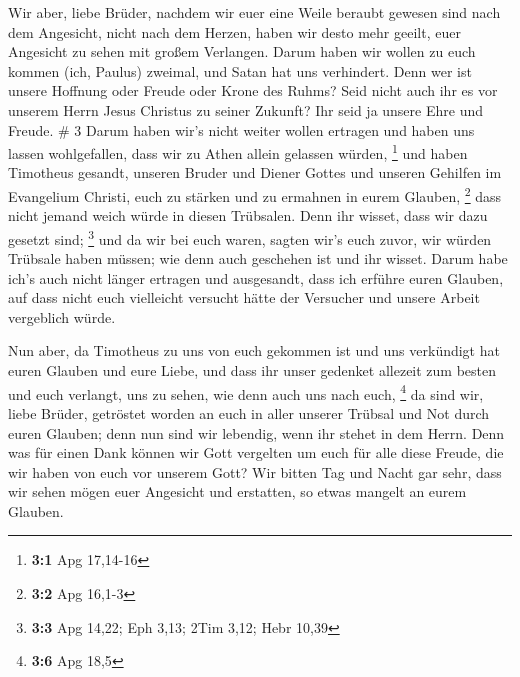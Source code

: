  Wir aber, liebe Brüder, nachdem wir euer eine Weile
beraubt gewesen sind nach dem Angesicht, nicht nach dem Herzen, haben
wir desto mehr geeilt, euer Angesicht zu sehen mit großem Verlangen.
 Darum haben wir wollen zu euch kommen (ich, Paulus)
zweimal, und Satan hat uns verhindert.  Denn wer ist unsere
Hoffnung oder Freude oder Krone des Ruhms? Seid nicht auch ihr es vor
unserem Herrn Jesus Christus zu seiner Zukunft?  Ihr seid
ja unsere Ehre und Freude. \# 3  Darum haben wir's nicht
weiter wollen ertragen und haben uns lassen wohlgefallen, dass wir zu
Athen allein gelassen würden, \footnote{\textbf{3:1} Apg 17,14-16}
 und haben Timotheus gesandt, unseren Bruder und Diener
Gottes und unseren Gehilfen im Evangelium Christi, euch zu stärken und
zu ermahnen in eurem Glauben, \footnote{\textbf{3:2} Apg 16,1-3}
 dass nicht jemand weich würde in diesen Trübsalen. Denn ihr
wisset, dass wir dazu gesetzt sind; \footnote{\textbf{3:3} Apg 14,22;
  Eph 3,13; 2Tim 3,12; Hebr 10,39}  und da wir bei euch
waren, sagten wir's euch zuvor, wir würden Trübsale haben müssen; wie
denn auch geschehen ist und ihr wisset.  Darum habe ich's
auch nicht länger ertragen und ausgesandt, dass ich erführe euren
Glauben, auf dass nicht euch vielleicht versucht hätte der Versucher und
unsere Arbeit vergeblich würde.

 Nun aber, da Timotheus zu uns von euch gekommen ist und uns
verkündigt hat euren Glauben und eure Liebe, und dass ihr unser gedenket
allezeit zum besten und euch verlangt, uns zu sehen, wie denn auch uns
nach euch, \footnote{\textbf{3:6} Apg 18,5}  da sind wir,
liebe Brüder, getröstet worden an euch in aller unserer Trübsal und Not
durch euren Glauben;  denn nun sind wir lebendig, wenn ihr
stehet in dem Herrn.  Denn was für einen Dank können wir
Gott vergelten um euch für alle diese Freude, die wir haben von euch vor
unserem Gott?  Wir bitten Tag und Nacht gar sehr, dass wir
sehen mögen euer Angesicht und erstatten, so etwas mangelt an eurem
Glauben.

